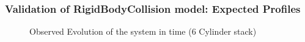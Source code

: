 \documentclass{beamer}
\begin{document}
 \begin{frame} %
  \frametitle{Validation of RigidBodyCollision model: Expected Profiles} 
  	  \begin{figure}
 	   \caption{Observed Evolution of the system in time (6 Cylinder stack)}
 	   \end{figure}
  \end{frame}
 
\end{document}
